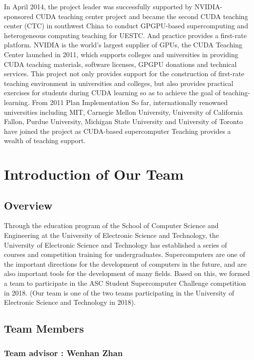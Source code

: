 \documentclass{mcmthesis}
\begin{document}
\par In April 2014, the project leader was successfully supported by NVIDIA-sponsored CUDA teaching center project and became the second CUDA teaching center (CTC) in southwest China to conduct GPGPU-based supercomputing and heterogeneous computing teaching for UESTC. And practice provides a first-rate platform. NVIDIA is the world's largest supplier of GPUs, the CUDA Teaching Center launched in 2011, which supports colleges and universities in providing CUDA teaching materials, software licenses, GPGPU donations and technical services. This project not only provides support for the construction of first-rate teaching environment in universities and colleges, but also provides practical exercises for students during CUDA learning so as to achieve the goal of teaching-learning. From 2011 Plan Implementation So far, internationally renowned universities including MIT, Carnegie Mellon University, University of California Fallon, Purdue University, Michigan State University and University of Toronto have joined the project as CUDA-based supercomputer Teaching provides a wealth of teaching support.


\section{Introduction of Our Team}
\subsection{Overview}
\par Through the education program of the School of Computer Science and Engineering at the University of Electronic Science and Technology, the University of Electronic Science and Technology has established a series of courses and competition training for undergraduates. Supercomputers are one of the important directions for the development of computers in the future, and are also important tools for the development of many fields. Based on this, we formed a team to participate in the ASC Student Supercomputer Challenge competition in 2018. (Our team is one of the two teams participating in the University of Electronic Science and Technology in 2018).

\subsection{Team Members}
\subsubsection*{\textbf{Team advisor} : Wenhan Zhan}
\end{document}
